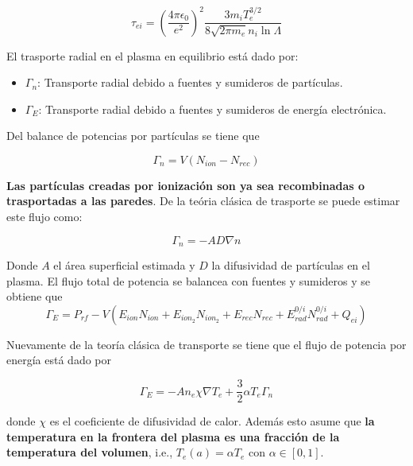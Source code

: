   \begin{equation}\label{eq:tau}
    \tau_{ei} = \left(\frac{4\pi\epsilon_0}{e^2}\right)^2\frac{3m_iT_e^{3/2}}{8\sqrt{2\pi m_e}n_i\ln{\Lambda}}
  \end{equation}

  El trasporte radial en el plasma en equilibrio est\'a dado por:

  \begin{itemize}
    \item $\Gamma_n$: Transporte radial debido a fuentes y sumideros de part\'iculas.
    \item $\Gamma_E$: Transporte radial debido a fuentes y sumideros de energ\'ia electr\'onica.
  \end{itemize}

  Del balance de potencias por part\'iculas se tiene que

  \begin{equation}\label{eq:7}
    \Gamma_n = V(N_{ion} - N_{rec})
  \end{equation}

  \textbf{Las part\'iculas creadas por ionizaci\'on son ya sea recombinadas o trasportadas a las paredes}. De la te\'oria cl\'asica de trasporte se puede estimar este flujo como:

  \begin{equation}\label{eq:Gamma_n}
    \Gamma_n = -AD\nabla n
  \end{equation}

  Donde $A$ el \'area superficial estimada y $D$ la difusividad de part\'iculas en el plasma. El flujo total de potencia se balancea con fuentes y sumideros y se obtiene que 
  \begin{equation}\label{eq:8}
    \Gamma_E = P_{rf} - V(E_{ion}N_{ion} + E_{ion_2}N_{ion_2} + E_{rec}N_{rec} + E_{rad}^{0/i}N_{rad}^{0/i} + Q_{ei})
  \end{equation}

  Nuevamente de la teor\'ia cl\'asica de transporte se tiene que el flujo de potencia por energ\'ia est\'a dado por

  \begin{equation}\label{eq:9}
    \Gamma_E = -An_e\chi\nabla T_e + \frac{3}{2}\alpha T_e\Gamma_n
  \end{equation}

  donde $\chi$ es el coeficiente de difusividad de calor. Adem\'as esto asume que \textbf{la temperatura en la frontera del plasma es una fracci\'on de la temperatura del volumen}, i.e., $T_e(a) = \alpha T_e$ con $\alpha \in [0,1]$.
  
